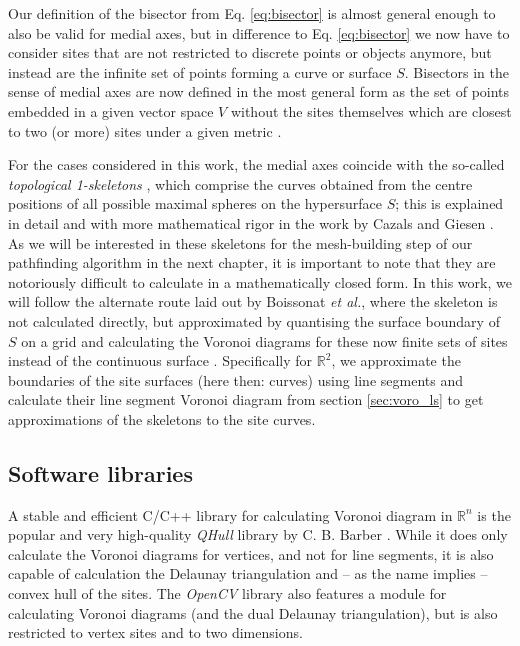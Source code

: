 Our definition of the bisector from Eq. \ref{eq:bisector} is almost general enough to also be valid for medial axes,
but in difference to Eq. \ref{eq:bisector} we now have to consider sites that are not restricted to discrete points or 
objects anymore, but instead are the infinite set of points forming a curve or surface $S$.
Bisectors in the sense of medial axes are now defined in the most general form as the set of points
embedded in a given vector space $V$ without the sites themselves which are closest to two (or more) 
sites under a given metric \cite[p. 244]{Cazals2006}.

For the cases considered in this work, the medial axes coincide with the so-called \textit{topological 1-skeletons} 
\cite{wiki_skeleton, wiki_nskeleton, wiki_medial2} \cite[p. 169]{Berg2008}, which comprise the curves obtained from the centre positions of all possible maximal 
spheres on the hypersurface $S$; this is explained in detail and with more mathematical rigor in the work by 
Cazals and Giesen \cite[pp. 246f]{Cazals2006}.
As we will be interested in these skeletons for the mesh-building step of our pathfinding algorithm in the next
chapter, it is important to note that they are notoriously difficult to calculate in a mathematically closed form.
In this work, we will follow the alternate route laid out by Boissonat \textit{et al.}, where the skeleton is 
not calculated directly, but approximated by quantising the surface boundary of $S$ on a grid and calculating 
the Voronoi diagrams for these now finite sets of sites instead of the continuous surface \cite[pp. 109-110]{Boissonnat2006}.
Specifically for $\mathbb{R}^2$, we approximate the boundaries of the site surfaces (here then: curves) 
using line segments and calculate their line segment Voronoi diagram from section \ref{sec:voro_ls} to get 
approximations of the skeletons to the site curves.




\subsection{Software libraries}
\label{sec:voronoi_libs}
A stable and efficient C/C++ library for calculating Voronoi diagram in $\mathbb{R}^n$ is the popular and very 
high-quality \textit{QHull} library by C. B. Barber \cite{web_qhull}. While it does only calculate 
the Voronoi diagrams for vertices, and not for line segments, it is also capable of calculation the Delaunay
triangulation and -- as the name implies -- convex hull of the sites.
The \textit{OpenCV} library \cite{web_opencv} also features a module for calculating Voronoi diagrams
(and the dual Delaunay triangulation), but is also restricted to vertex sites and to two dimensions.

